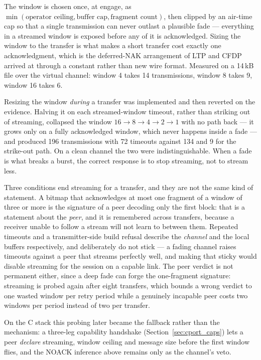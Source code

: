 The window is chosen once, at engage, as
$\min(\text{operator ceiling}, \text{buffer cap},
\text{fragment count})$, then clipped by an air-time cap so that a
single transmission can never outlast a plausible fade --- everything
in a streamed window is exposed before any of it is acknowledged.
Sizing the window to the transfer is what makes a short transfer cost
exactly one acknowledgment, which is the deferred-NAK arrangement of
LTP and CFDP arrived at through a constant rather than new wire
format.  Measured on a 14\,kB file over the virtual channel: window 4
takes 14 transmissions, window 8 takes 9, window 16 takes 6.

Resizing the window \emph{during} a transfer was implemented and then
reverted on the evidence.  Halving it on each streamed-window timeout,
rather than striking out of streaming, collapsed the window
$16\to8\to4\to2\to1$ with no path back --- it grows only on a fully
acknowledged window, which never happens inside a fade --- and produced
196 transmissions with 72 timeouts against 134 and 9 for the
strike-out path.  On a clean channel the two were indistinguishable.
When a fade is what breaks a burst, the correct response is to stop
streaming, not to stream less.

Three conditions end streaming for a transfer, and they are not the
same kind of statement.  A bitmap that acknowledges at most one
fragment of a window of three or more is the signature of a peer
decoding only the first block: that is a statement about the
\emph{peer}, and it is remembered across transfers, because a receiver
unable to follow a stream will not learn to between them.  Repeated
timeouts and a transmitter-side build refusal describe the
\emph{channel} and the local buffers respectively, and deliberately do
not stick --- a fading channel raises timeouts against a peer that
streams perfectly well, and making that sticky would disable streaming
for the session on a capable link.  The peer verdict is not permanent
either, since a deep fade can forge the one-fragment signature:
streaming is probed again after eight transfers, which bounds a wrong
verdict to one wasted window per retry period while a genuinely
incapable peer costs two windows per period instead of two per
transfer.

On the C stack this probing later became the fallback rather than the
mechanism: a three-leg capability handshake
(Section~\ref{sec:cport_caps}) lets a peer \emph{declare} streaming,
window ceiling and message size before the first window flies, and the
NOACK inference above remains only as the channel's veto.

